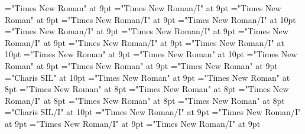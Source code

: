 \documentclass[gps1,twoside]{article}
\begin{document}
\font\sensespanspandiventryletData="Times New Roman" at 9pt
\font\morphosyntaxanalysissensesensesentrysensespanspandiventryletData="Times New Roman/I" at 9pt
\font\morphosyntaxanalysissensesensesentryaftersensespanspandiventryletData="Times New Roman" at 9pt
\font\partofspeechmorphosyntaxanalysissensesensesentrysensespanspandiventryletData="Times New Roman/I" at 9pt
\font\spanenpartofspeechmorphosyntaxanalysissensesensesentrysensespanspandiventryletData="Times New Roman/I" at 10pt
\font\spanmorphosyntaxanalysissensesensesentrysensespanspandiventryletData="Times New Roman/I" at 9pt
\font\slotsmorphosyntaxanalysissensesensesentrybeforemorphosyntaxanalysissensesensesentrysensespanspandiventryletData="Times New Roman/I" at 9pt
\font\slotspanmorphosyntaxanalysissensesensesentrysensespanspandiventryletData="Times New Roman/I" at 9pt
\font\spanslotspanmorphosyntaxanalysissensesensesentrysensespanspandiventryletData="Times New Roman/I" at 9pt
\font\spanenspanslotspanmorphosyntaxanalysissensesensesentrysensespanspandiventryletData="Times New Roman/I" at 10pt
\font\spansensespanspandiventryletData="Times New Roman" at 9pt
\font\spanenspansensespanspandiventryletData="Times New Roman" at 10pt
\font\pronunciationsentryafterdiventryletData="Times New Roman" at 9pt
\font\pronunciationspandiventryletData="Times New Roman" at 9pt
\font\spanpronunciationspandiventryletData="Times New Roman" at 9pt
\font\spanbzhfonipaspanpronunciationspandiventryletData="Charis SIL" at 10pt
\font\examplessensesensesentryaftersensespanspandiventryletData="Times New Roman" at 9pt
\font\examplespansensespanspandiventryletData="Times New Roman" at 8pt
\font\examplebeforespansensespanspandiventryletData="Times New Roman" at 8pt
\font\exampleafterspansensespanspandiventryletData="Times New Roman" at 8pt
\font\exampleexamplespansensespanspandiventryletData="Times New Roman/I" at 8pt
\font\examplebeforeexamplespansensespanspandiventryletData="Times New Roman" at 8pt
\font\exampleafterexamplespansensespanspandiventryletData="Times New Roman" at 8pt
\font\spanbzhexampleexamplespansensespanspandiventryletData="Charis SIL/I" at 10pt
\font\spanexampleexampleexamplessensesensessensesensesentryexamplespansensespanspandiventryletData="Times New Roman/I" at 9pt
\font\translationspanexampleexampleexamplessensesensessensesensesentryexamplespansensespanspandiventryletData="Times New Roman/I" at 9pt
\font\translationafterspanexampleexampleexamplessensesensessensesensesentryexamplespansensespanspandiventryletData="Times New Roman/I" at 9pt
\font\translationtranslationspanexampleexampleexamplessensesensessensesensesentryexamplespansensespanspandiventryletData="Times New Roman/I" at 9pt
\end{document}
